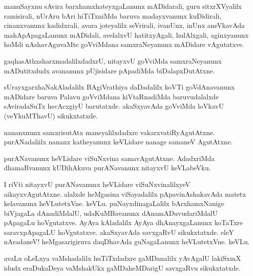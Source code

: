 \documentclass{article}
\begin{document}
\begin{mng}%
manuSayxnu sAvira barxhamxhateyxgaLanunx mADidarali, guru 
sitxrXVyalilx ramisirali, nUrAru bAri hiTiTxniMda baruva madayxvanunx kuDidirali,
cinanxvanunx kadidxrali, avara joteyalilx seVrirali, ivanUnx, inUnx aneVkavAda
mahApApagaLanunx mADidali, avelalxvU hatitxyAgali, hulAlxgali,
aginxyanunx hoMdi nAshavAguvaMte goVviMdana samxraNeyanunx mADidare
vAgutatxve.
\end{mng}

\begin{mng}%
gaqhasAthxsharxmadalilxdadxrU, nitayxvU goVviMda samxraNeyanunx
mADutitxdudx avananunx pUjisidare pApadiMda biDalapxDutAtxne.
\end{mng}

\begin{mng}%
sUrayxgarxhaNakAladalilx BAgiVrathiya daDadalilx koVTi goVdAnavanunx
mADidare baruva Palavu goVviMdana kiVtaRnadiMda baruvudalalxde
sAviradaSuTx hecAcxgiyU barutatxde. akaSxyavAda goVviMda loVkavU
(veYkuMThavU) sikukxtatxde.
\end{mng}

\begin{mng}%
nananxnunx samxrisutAtx maneyalilxdadxre vakarxvatiRyAgutAtxne.
purANadaliilx nananx katheyanunx keVLidare nanage samaneV AgutAtxne.
\end{mng}

\begin{mng}%
purANavanunx heVLidare viSuNxvina samavAgutAtxne. AdadxriMda
dhamaRvanunx kUDihAkuva purANavanunx nitayxvU keVLabeVku.
\end{mng}

\begin{mng}%
I riVti nitayxvU purANavanunx heVLidare viSuNxvinalilxyeV
aikayxvAgutAtxne. alalxde heMgasina viSayadalilx pApavinAshakavAda matetx
kelavanunx heVLutetxVne. keVLu. puNayxdinagaLalilx bArxhamxNanige biVjagaLa dAnadiMdalU,
udaKuMBavanunx dAnamADuvudariMdalU pApagaLu hoVgutatxve.
AyAya kAladalilx AyAya dhAnayxgaLanunx koTaTxre saravxpApagaLU hoVgutatxve.
akaSxyavAda savxgaRvU sikukxtatxde. eleY nAradaneV! heMgasarigiruva
daqDhavAda guNagaLanunx heVLutetxVne. keVLu.
\end{mng}

\begin{mng}%
avaLu oLeLxya vaMshadalilx huTiTxdadxre gaMDanalilx yAvAgalU
lakiSxmX idudx eraDukaDeya vaMshakUkx gaMDaheMDarigU savxgaRvu sikukxtatxde.
\end{mng}
\end{document}

